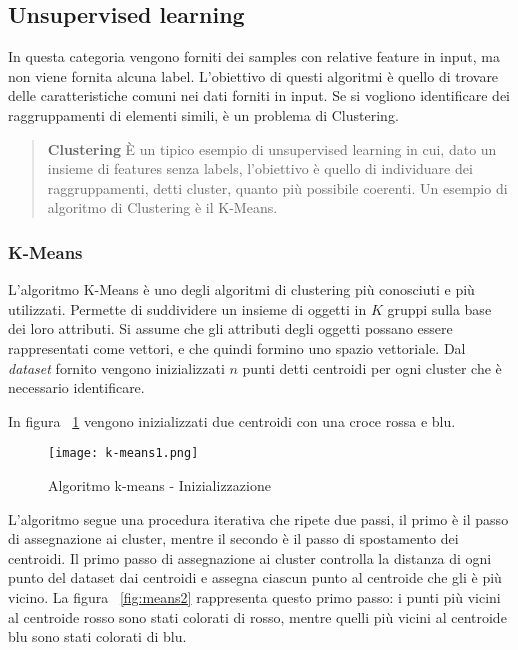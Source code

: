 \documentclass[../main.tex]{subfiles}
\begin{document}
\subsection{Unsupervised learning}
In questa categoria vengono forniti dei samples con relative feature in input, ma non viene fornita alcuna label. L'obiettivo di questi algoritmi è quello di trovare delle caratteristiche comuni nei dati forniti in input. Se si vogliono identificare dei raggruppamenti di elementi simili, è un problema di Clustering.


\begin{verse}
				\textbf{Clustering} È un tipico esempio di unsupervised learning in cui, dato un insieme di features senza labels, l'obiettivo è quello di individuare dei raggruppamenti, detti cluster, quanto più possibile coerenti. Un esempio di algoritmo di Clustering è il K-Means.
\end{verse}	

\subsubsection{K-Means}
L'algoritmo K-Means è uno degli algoritmi di clustering più conosciuti e più utilizzati. Permette di suddividere un insieme di oggetti in $K$ gruppi sulla base dei loro attributi.
Si assume che gli attributi degli oggetti possano essere rappresentati come vettori, e che quindi formino uno spazio vettoriale. Dal \textit{dataset} fornito vengono inizializzati $n$ punti detti centroidi per ogni cluster che è necessario identificare.

In figura ~\ref{fig:means1} vengono inizializzati due centroidi con una croce rossa e blu.

\begin{figure}[H]
				\centering
				\texttt{[image: k-means1.png]}
				\caption{Algoritmo k-means - Inizializzazione}
				\label{fig:means1}
\end{figure}

L'algoritmo segue una procedura iterativa che ripete due passi, il primo è il passo di assegnazione ai cluster, mentre il secondo è il passo di spostamento dei centroidi.
Il primo passo di assegnazione ai cluster controlla la distanza di ogni punto del dataset dai centroidi e assegna ciascun punto al centroide che gli è più vicino. 
La figura ~\ref{fig:means2} rappresenta questo primo passo: i punti più vicini al centroide rosso sono stati colorati di rosso, mentre quelli più vicini al centroide blu sono stati colorati di blu.
\end{document}
